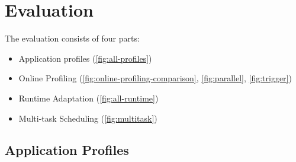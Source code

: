 \section{Evaluation}
\label{sec:evaluation}

The evaluation consists of four parts:

\begin{itemize}
\item Application profiles (\autoref{fig:all-profiles})
\item Online Profiling (\autoref{fig:online-profiling-comparison},
  \autoref{fig:parallel}, \autoref{fig:trigger})
\item Runtime Adaptation (\autoref{fig:all-runtime})
\item Multi-task Scheduling (\autoref{fig:multitask})
\end{itemize}

\subsection{Application Profiles}
\label{sec:application-profiles}

